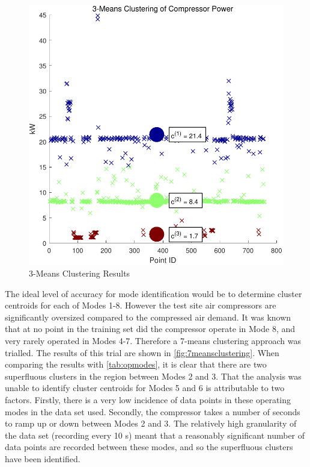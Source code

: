 \begin{figure}
\includegraphics[width = \columnwidth]{./Images/3MeansClustering.pdf}
\caption{3-Means Clustering Results}
\label{fig:3meansclustering}
\end{figure}

The ideal level of accuracy for mode identification would be to determine cluster centroids for each of Modes 1-8. However the test site air compressors are significantly oversized compared to the compressed air demand. It was known that at no point in the training set did the compressor operate in Mode 8, and very rarely operated in Modes 4-7. Therefore a 7-means clustering approach was trialled. The results of this trial are shown in \autoref{fig:7meansclustering}. When comparing the results with \autoref{tab:opmodes}, it is clear that there are two superfluous clusters in the region between Modes 2 and 3. That the analysis was unable to identify cluster centroids for Modes 5 and 6 is attributable to two factors. Firstly, there is a very low incidence of data points in these operating modes in the data set used. Secondly, the compressor takes a number of seconds to ramp up or down between Modes 2 and 3. The relatively high granularity of the data set (recording every 10 s) meant that a reasonably significant number of data points are recorded between these modes, and so the superfluous clusters have been identified.

